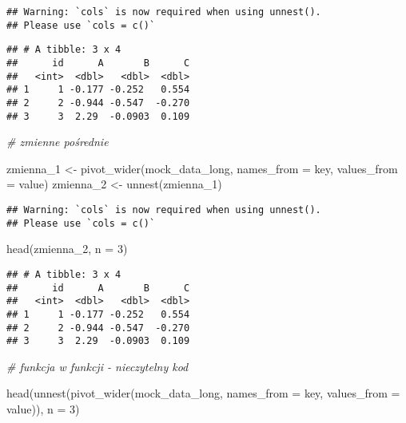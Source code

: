 \documentclass[
]{book}
\newenvironment{Shaded}{\begin{snugshade}}{\end{snugshade}}
\newcommand{\AttributeTok}[1]{\textcolor[rgb]{0.77,0.63,0.00}{#1}}
\newcommand{\CommentTok}[1]{\textcolor[rgb]{0.56,0.35,0.01}{\textit{#1}}}
\newcommand{\DecValTok}[1]{\textcolor[rgb]{0.00,0.00,0.81}{#1}}
\newcommand{\FunctionTok}[1]{\textcolor[rgb]{0.00,0.00,0.00}{#1}}
\newcommand{\NormalTok}[1]{#1}
\newcommand{\OtherTok}[1]{\textcolor[rgb]{0.56,0.35,0.01}{#1}}
\begin{document}
\begin{verbatim}
## Warning: `cols` is now required when using unnest().
## Please use `cols = c()`
\end{verbatim}

\begin{verbatim}
## # A tibble: 3 x 4
##      id      A       B      C
##   <int>  <dbl>   <dbl>  <dbl>
## 1     1 -0.177 -0.252   0.554
## 2     2 -0.944 -0.547  -0.270
## 3     3  2.29  -0.0903  0.109
\end{verbatim}

\begin{Shaded}
\begin{Highlighting}[]
\CommentTok{\# zmienne pośrednie}

\NormalTok{zmienna\_1 }\OtherTok{\textless{}{-}} \FunctionTok{pivot\_wider}\NormalTok{(mock\_data\_long, }\AttributeTok{names\_from =}\NormalTok{ key, }\AttributeTok{values\_from =}\NormalTok{ value) }
\NormalTok{zmienna\_2 }\OtherTok{\textless{}{-}} \FunctionTok{unnest}\NormalTok{(zmienna\_1)}
\end{Highlighting}
\end{Shaded}

\begin{verbatim}
## Warning: `cols` is now required when using unnest().
## Please use `cols = c()`
\end{verbatim}

\begin{Shaded}
\begin{Highlighting}[]
\FunctionTok{head}\NormalTok{(zmienna\_2, }\AttributeTok{n =} \DecValTok{3}\NormalTok{)}
\end{Highlighting}
\end{Shaded}

\begin{verbatim}
## # A tibble: 3 x 4
##      id      A       B      C
##   <int>  <dbl>   <dbl>  <dbl>
## 1     1 -0.177 -0.252   0.554
## 2     2 -0.944 -0.547  -0.270
## 3     3  2.29  -0.0903  0.109
\end{verbatim}

\begin{Shaded}
\begin{Highlighting}[]
\CommentTok{\# funkcja w funkcji {-} nieczytelny kod}

\FunctionTok{head}\NormalTok{(}\FunctionTok{unnest}\NormalTok{(}\FunctionTok{pivot\_wider}\NormalTok{(mock\_data\_long, }\AttributeTok{names\_from =}\NormalTok{ key, }\AttributeTok{values\_from =}\NormalTok{ value)), }\AttributeTok{n =} \DecValTok{3}\NormalTok{)}
\end{Highlighting}
\end{Shaded}
\end{document}
